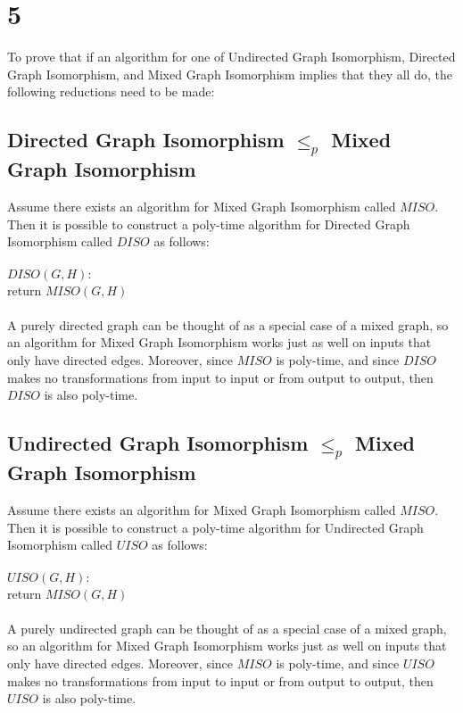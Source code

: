 \documentclass[letterpaper,notitlepage,twoside]{article}
\newcommand\tab[1][1cm]{\hspace*{#1}} %
\begin{document}
\section*{5}
To prove that if an algorithm for one of Undirected Graph Isomorphism, Directed Graph Isomorphism, and Mixed Graph Isomorphism implies that they all do, the following reductions need to be made:

\subsection*{Directed Graph Isomorphism $\leq_p$ Mixed Graph Isomorphism}
Assume there exists an algorithm for Mixed Graph Isomorphism called $MISO$. Then it is possible to construct a poly-time algorithm for Directed Graph Isomorphism called $DISO$ as follows:
\\\\
$DISO(G, H):$\\
\tab return $MISO(G, H)$
\\\\
A purely directed graph can be thought of as a special case of a mixed graph, so an algorithm for Mixed Graph Isomorphism works just as well on inputs that only have directed edges. Moreover, since $MISO$ is poly-time, and since $DISO$ makes no transformations from input to input or from output to output, then $DISO$ is also poly-time.

\subsection*{Undirected Graph Isomorphism $\leq_p$ Mixed Graph Isomorphism}
Assume there exists an algorithm for Mixed Graph Isomorphism called $MISO$. Then it is possible to construct a poly-time algorithm for Undirected Graph Isomorphism called $UISO$ as follows:
\\\\
$UISO(G, H):$\\
\tab return $MISO(G, H)$
\\\\
A purely undirected graph can be thought of as a special case of a mixed graph, so an algorithm for Mixed Graph Isomorphism works just as well on inputs that only have directed edges. Moreover, since $MISO$ is poly-time, and since $UISO$ makes no transformations from input to input or from output to output, then $UISO$ is also poly-time.
\end{document}
